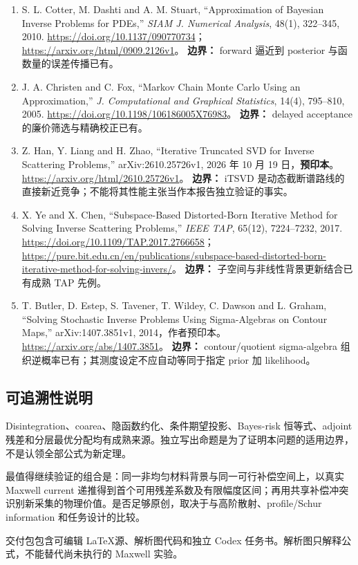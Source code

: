 \begin{enumerate}[label=\textbf{L\arabic*.},leftmargin=3em,itemsep=.7em]
\item S. L. Cotter, M. Dashti and A. M. Stuart, “Approximation of Bayesian Inverse Problems for PDEs,” \emph{SIAM J. Numerical Analysis}, 48(1), 322--345, 2010.
\url{https://doi.org/10.1137/090770734}；
\url{https://arxiv.org/html/0909.2126v1}。
\textbf{边界：} forward 逼近到 posterior 与函数量的误差传播已有。

\item J. A. Christen and C. Fox, “Markov Chain Monte Carlo Using an Approximation,” \emph{J. Computational and Graphical Statistics}, 14(4), 795--810, 2005.
\url{https://doi.org/10.1198/106186005X76983}。
\textbf{边界：} delayed acceptance 的廉价筛选与精确校正已有。

\item Z. Han, Y. Liang and H. Zhao, “Iterative Truncated SVD for Inverse Scattering Problems,” arXiv:2610.25726v1, 2026 年 10 月 19 日，\textbf{预印本}。
\url{https://arxiv.org/html/2610.25726v1}。
\textbf{边界：} iTSVD 是动态截断谱路线的直接新近竞争；不能将其性能主张当作本报告独立验证的事实。

\item X. Ye and X. Chen, “Subspace-Based Distorted-Born Iterative Method for Solving Inverse Scattering Problems,” \emph{IEEE TAP}, 65(12), 7224--7232, 2017.
\url{https://doi.org/10.1109/TAP.2017.2766658}；
\url{https://pure.bit.edu.cn/en/publications/subspace-based-distorted-born-iterative-method-for-solving-invers/}。
\textbf{边界：} 子空间与非线性背景更新结合已有成熟 TAP 先例。

\item T. Butler, D. Estep, S. Tavener, T. Wildey, C. Dawson and L. Graham, “Solving Stochastic Inverse Problems Using Sigma-Algebras on Contour Maps,” arXiv:1407.3851v1, 2014，作者预印本。
\url{https://arxiv.org/abs/1407.3851}。
\textbf{边界：} contour/quotient sigma-algebra 组织逆概率已有；其测度设定不应自动等同于指定 prior 加 likelihood。
\end{enumerate}

\subsection{可追溯性说明}
Disintegration、coarea、隐函数约化、条件期望投影、Bayes-risk 恒等式、adjoint 残差和分层最优分配均有成熟来源。独立写出命题是为了证明本问题的适用边界，不是认领全部公式为新定理。

最值得继续验证的组合是：同一非均匀材料背景与同一可行补偿空间上，以真实 Maxwell current 递推得到首个可用残差系数及有限幅度区间；再用共享补偿冲突识别新采集的物理价值。是否足够原创，取决于与高阶散射、profile/Schur information 和任务设计的比较。

交付包包含可编辑 \LaTeX 源、解析图代码和独立 Codex 任务书。解析图只解释公式，不能替代尚未执行的 Maxwell 实验。

